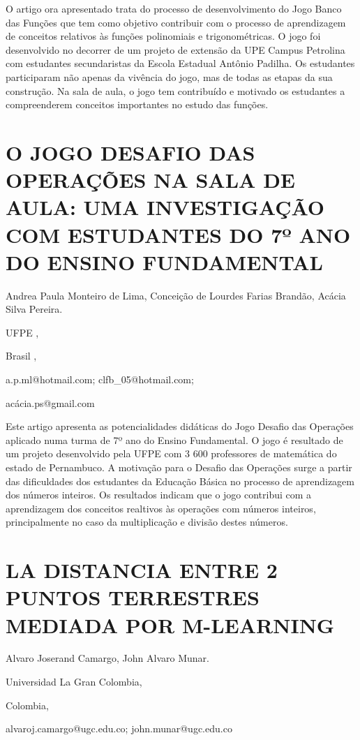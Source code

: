 O artigo ora apresentado trata do processo de desenvolvimento do Jogo
Banco das Funções que tem como objetivo contribuir com o processo
de aprendizagem de conceitos relativos às funções polinomiais e trigonométricas.
O jogo foi desenvolvido no decorrer de um projeto de extensão da UPE
Campus Petrolina com estudantes secundaristas da Escola Estadual Antônio
Padilha. Os estudantes participaram não apenas da vivência do jogo,
mas de todas as etapas da sua construção. Na sala de aula, o jogo
tem contribuído e motivado os estudantes a compreenderem conceitos
importantes no estudo das funções. 


\section{O JOGO DESAFIO DAS OPERAÇÕES NA SALA DE AULA: UMA INVESTIGAÇÃO COM
ESTUDANTES DO 7º ANO DO ENSINO FUNDAMENTAL}

\begin{datos}

Andrea Paula Monteiro de Lima, Conceição de Lourdes Farias Brandão,
Acácia Silva Pereira.

UFPE ,

Brasil ,

a.p.ml@hotmail.com; clfb\_05@hotmail.com;

acácia.ps@gmail.com

\end{datos}

Este artigo apresenta as potencialidades didáticas do Jogo Desafio
das Operações aplicado numa turma de 7º ano do Ensino Fundamental.
O jogo é resultado de um projeto desenvolvido pela UFPE com 3 600
professores de matemática do estado de Pernambuco. A motivação para
o Desafio das Operações surge a partir das dificuldades dos estudantes
da Educação Básica no processo de aprendizagem dos números inteiros.
Os resultados indicam que o jogo contribui com a aprendizagem dos
conceitos realtivos às operações com números inteiros, principalmente
no caso da multiplicação e divisão destes números.


\section{LA DISTANCIA ENTRE 2 PUNTOS TERRESTRES MEDIADA POR M-LEARNING }

\begin{datos}

Alvaro Joserand Camargo, John Alvaro Munar.

Universidad La Gran Colombia, 

Colombia,

alvaroj.camargo@ugc.edu.co; john.munar@ugc.edu.co

\end{datos}

